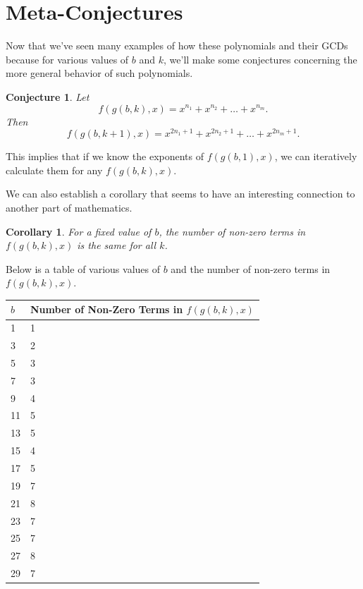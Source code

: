 \documentclass{article}
\newtheorem{corollary}{Corollary}
\newtheorem{conjecture}{Conjecture}
\begin{document}
	\newpage
	\section{Meta-Conjectures}
	Now that we've seen many examples of how these polynomials and their GCDs because for various values of $b$ and $k$, we'll make some conjectures concerning the more general behavior of such polynomials.
	
	\begin{conjecture}
		Let
		\begin{equation*}
			f(g(b,k),x) = x^{n_1} + x^{n_2} + \dots + x^{n_m}.
		\end{equation*}
		Then
		\begin{equation*}
			f(g(b,k+1),x) = x^{2n_1 + 1} + x^{2n_2 + 1} + \dots + x^{2n_m + 1}.
		\end{equation*}
	\end{conjecture}
	This implies that if we know the exponents of $f(g(b,1),x)$, we can iteratively calculate them for any $f(g(b,k),x)$.
	
	We can also establish a corollary that seems to have an interesting connection to another part of mathematics.
	\begin{corollary}
		For a fixed value of $b$, the number of non-zero terms in $f(g(b,k),x)$ is the same for all $k$.
	\end{corollary}
	Below is a table of various values of $b$ and the number of non-zero terms in $f(g(b,k),x)$.
	
	\begin{table}[H]
		\centering
		\begin{tabular}{|l||l|}
			\hline
			$b$ & Number of Non-Zero Terms in $f(g(b,k),x)$ \\
			\hline\hline
			1 & 1 \\
			\hline
			3 & 2 \\
			\hline
			5 & 3 \\
			\hline
			7 & 3 \\
			\hline
			9 & 4 \\
			\hline
			11 & 5 \\
			\hline
			13 & 5 \\
			\hline
			15 & 4 \\
			\hline
			17 & 5 \\
			\hline
			19 & 7 \\
			\hline
			21 & 8 \\
			\hline
			23 & 7 \\
			\hline
			25 & 7 \\
			\hline
			27 & 8 \\
			\hline
			29 & 7 \\
			\hline
		\end{tabular}
	\end{table}
	
\end{document}
